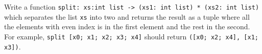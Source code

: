Write a function \lstinline{split: xs:int list -> (xs1: int list) * (xs2: int list)} which separates the list \lstinline{xs} into two and returns the result as a tuple where all the elements with even index is in the first element and the rest in the second. For example, \mbox{\lstinline{split [x0; x1; x2; x3; x4]}} should return \mbox{\lstinline{([x0; x2; x4], [x1; x3])}}.
